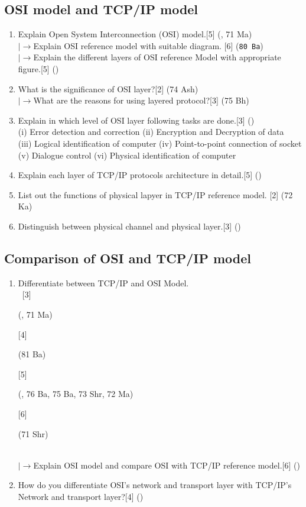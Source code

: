 \documentclass[12pt]{article}
\newcommand{\lb}{\\$\left|\rightarrow\right.$}
\newcommand{\enter}{\\\textcolor{white}{1}}
\begin{document}
\subsection{OSI model and TCP/IP model}
\begin{enumerate}[noitemsep, topsep = 0pt]
\item Explain Open System Interconnection (OSI) model.\hfill[5] (, 71 Ma)
\lb Explain OSI reference model with suitable diagram. \hfill [6] (\texttt{80 Ba})
\lb Explain the different layers of OSI reference Model with appropriate figure.\hfill[5] ()
\item What is the significance of OSI layer?\hfill[2] (74 Ash)
\lb What are the reasons for using layered protocol?\hfill[3] (75 Bh)
\item Explain in which level of OSI layer following tasks are done.\hfill[3] ()\\
(i) Error detection and correction \hspace{20mm} (ii) Encryption and Decryption of data\\
(iii) Logical identification of computer \hspace{11mm} (iv) Point-to-point connection of socket\\
(v) Dialogue control \hspace{45mm}(vi) Physical identification of computer
\item Explain each layer of TCP/IP protocols architecture in detail.\hfill[5] ()

\item List out the functions of physical lapyer in TCP/IP reference model. \hfill [2] (72 Ka)

\item Distinguish between physical channel and physical layer.\hfill[3] ()
\end{enumerate}

\subsection{Comparison of OSI and TCP/IP model}
\begin{enumerate}[noitemsep, topsep = 0pt]
\item Differentiate between TCP/IP and OSI Model.
\enter\hfill[3] \begin{footnotesize}(, 71 Ma)\end{footnotesize} [4] \begin{footnotesize}(81 Ba)\end{footnotesize} [5] \begin{footnotesize}(, 76 Ba, 75 Ba, 73 Shr, 72 Ma)\end{footnotesize} [6] \begin{footnotesize}(71 Shr)\end{footnotesize} 
\lb Explain OSI model and compare OSI with TCP/IP reference model.\hfill[6] ()
\item How do you differentiate OSI's network and transport layer with TCP/IP's Network and transport layer?\hfill[4] ()
\end{enumerate}
\end{document}
